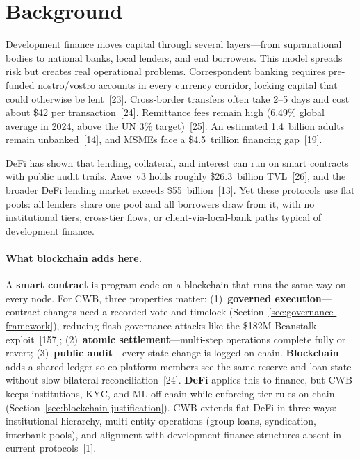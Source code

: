 \documentclass[12pt,a4paper]{report}
\begin{document}
\section{Background}

Development finance moves capital through several layers---from supranational bodies to national banks, local lenders, and end borrowers. This model spreads risk but creates real operational problems. Correspondent banking requires pre-funded nostro/vostro accounts in every currency corridor, locking capital that could otherwise be lent~[23]. Cross-border transfers often take 2--5 days and cost about \$42 per transaction~[24]. Remittance fees remain high (6.49\% global average in 2024, above the UN 3\% target)~[25]. An estimated 1.4~billion adults remain unbanked~[14], and MSMEs face a \$4.5~trillion financing gap~[19].

DeFi has shown that lending, collateral, and interest can run on smart contracts with public audit trails. Aave~v3 holds roughly \$26.3~billion TVL~[26], and the broader DeFi lending market exceeds \$55~billion~[13]. Yet these protocols use flat pools: all lenders share one pool and all borrowers draw from it, with no institutional tiers, cross-tier flows, or client-via-local-bank paths typical of development finance.

\paragraph{What blockchain adds here.}
A \textbf{smart contract} is program code on a blockchain that runs the same way on every node. For CWB, three properties matter: (1)~\textbf{governed execution}---contract changes need a recorded vote and timelock (Section~\ref{sec:governance-framework}), reducing flash-governance attacks like the \$182M Beanstalk exploit~[157]; (2)~\textbf{atomic settlement}---multi-step operations complete fully or revert; (3)~\textbf{public audit}---every state change is logged on-chain. \textbf{Blockchain} adds a shared ledger so co-platform members see the same reserve and loan state without slow bilateral reconciliation~[24]. \textbf{DeFi} applies this to finance, but CWB keeps institutions, KYC, and ML off-chain while enforcing tier rules on-chain (Section~\ref{sec:blockchain-justification}). CWB extends flat DeFi in three ways: institutional hierarchy, multi-entity operations (group loans, syndication, interbank pools), and alignment with development-finance structures absent in current protocols~[1].
\end{document}

